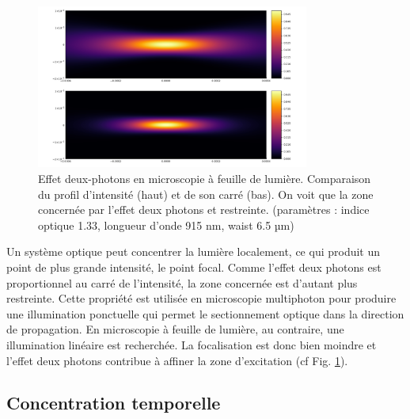 \begin{figure}
    \centering
    \includegraphics[width=0.8\textwidth]{./files/profile-intensity.png}
    \caption{Effet deux-photons en microscopie à feuille de lumière. Comparaison du profil d'intensité (haut) et de son carré (bas). On voit que la zone concernée par l'effet deux photons et restreinte. (paramètres : indice optique 1.33, longueur d'onde 915 nm, waist 6.5 µm)
    }
    \label{2P-intensity-profile}
    \end{figure}

Un système optique peut concentrer la lumière localement, ce qui produit un point de plus grande intensité, le point focal. Comme l'effet deux photons est proportionnel au carré de l'intensité, la zone concernée est d'autant plus restreinte. Cette propriété est utilisée en microscopie multiphoton pour produire une illumination ponctuelle qui permet le sectionnement optique dans la direction de propagation. En microscopie à feuille de lumière, au contraire, une illumination linéaire est recherchée. La focalisation est donc bien moindre et l'effet deux photons contribue à affiner la zone d'excitation (cf Fig. \ref{2P-intensity-profile}).


\subsection{Concentration temporelle}\label{SECTIONconcentrationtemporelle}

